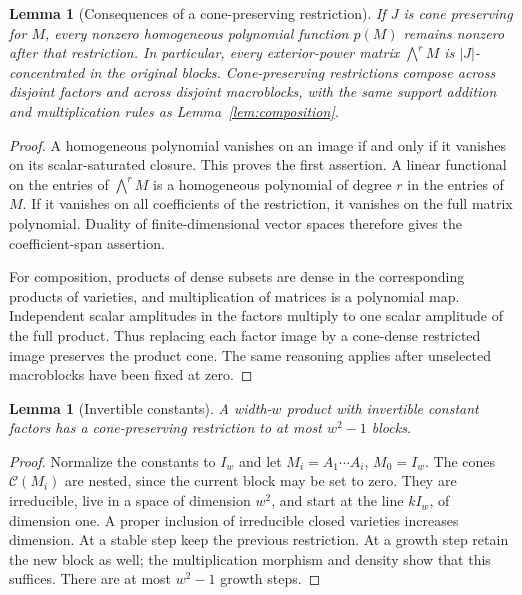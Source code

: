 \documentclass[11pt]{article}
\newtheorem{lemma}[theorem]{Lemma}
\theoremstyle{definition}\newtheorem{definition}[theorem]{Definition}
\theoremstyle{remark}\newtheorem{remark}[theorem]{Remark}
\begin{document}
\begin{lemma}[Consequences of a cone-preserving restriction]
\label{lem:cone-composition}
If $J$ is cone preserving for $M$, every nonzero homogeneous polynomial
function $p(M)$ remains nonzero after that restriction. In particular,
every exterior-power matrix $\bigwedge^r M$ is $|J|$-concentrated in the
original blocks. Cone-preserving restrictions compose across disjoint
factors and across disjoint macroblocks, with the same support addition
and multiplication rules as Lemma~\ref{lem:composition}.
\end{lemma}
\begin{proof}
A homogeneous polynomial vanishes on an image if and only if it vanishes
on its scalar-saturated closure. This proves the first assertion. A linear
functional on the entries of $\bigwedge^r M$ is a homogeneous polynomial
of degree $r$ in the entries of $M$. If it vanishes on all coefficients
of the restriction, it vanishes on the full matrix polynomial. Duality
of finite-dimensional vector spaces therefore gives the coefficient-span
assertion.

For composition, products of dense subsets are dense in the corresponding
products of varieties, and multiplication of matrices is a polynomial map.
Independent scalar amplitudes in the factors multiply to one scalar
amplitude of the full product. Thus replacing each factor image by a
cone-dense restricted image preserves the product cone. The same reasoning
applies after unselected macroblocks have been fixed at zero.
\end{proof}

\begin{lemma}[Invertible constants]\label{lem:cone-invertible}
A width-$w$ product with invertible constant factors has a cone-preserving
restriction to at most $w^2-1$ blocks.
\end{lemma}
\begin{proof}
Normalize the constants to $I_w$ and let $M_i=A_1\cdots A_i$, $M_0=I_w$.
The cones $\mathcal C(M_i)$ are nested, since the current block may be set
to zero. They are irreducible, live in a space of dimension $w^2$, and
start at the line $kI_w$, of dimension one. A proper inclusion of
irreducible closed varieties increases dimension. At a stable step keep
the previous restriction. At a growth step retain the new block as well;
the multiplication morphism and density show that this suffices. There
are at most $w^2-1$ growth steps.
\end{proof}
\end{document}
